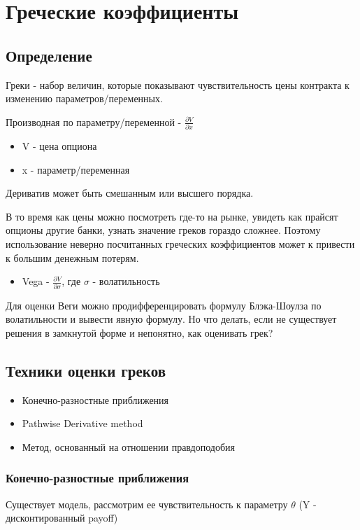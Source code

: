 \documentclass{article}
\begin{document}
\section{Греческие коэффициенты}
\subsection{Определение}
Греки - набор величин, которые показывают чувствительность цены контракта к изменению параметров/переменных.

Производная по параметру/переменной - \(\frac{\partial V}{\partial x}\)
\begin{itemize}
    \item V - цена опциона
    \item x - параметр/переменная
\end{itemize}

Дериватив может быть смешанным или высшего порядка.

В то время как цены можно посмотреть где-то на рынке, увидеть как прайсят опционы другие банки, узнать значение греков гораздо сложнее. Поэтому использование неверно посчитанных греческих коэффициентов может к привести к большим денежным потерям.

\begin{itemize}
    \item Vega - \(\frac{\partial V}{\partial \sigma}\), где \(\sigma\) - волатильность
\end{itemize}

Для оценки Веги можно продифференцировать формулу Блэка-Шоулза по волатильности и вывести явную формулу. Но что делать, если не существует решения в замкнутой форме и непонятно, как оценивать грек?
\subsection{Техники оценки греков}
\begin{itemize}
    \item Конечно-разностные приближения
    \item Pathwise Derivative method
    \item Метод, основанный на отношении правдоподобия
\end{itemize}
\subsubsection{Конечно-разностные приближения}
Существует модель, рассмотрим ее чувствительность к параметру \(\theta\) (Y - дисконтированный payoff)
\end{document}
